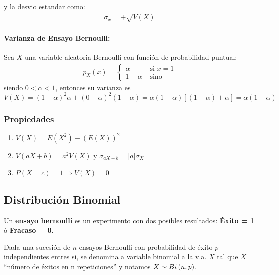 	y la desvio estandar como:
	\begin{align*}
	\sigma_x = +\sqrt{V(X)}
	\end{align*}
	
		\paragraph{Varianza de Ensayo Bernoulli:} Sea $X$ una variable aleatoria Bernoulli con función de probabilidad puntual:
		\begin{align*}
	        p_X(x) = \left\{
	        \begin{array}{cc}
	            \alpha & \text{ si } x = 1 \\
	            1-\alpha & \text{ sino}
	        \end{array}
	        \right.
		\end{align*}
		siendo $0 <\alpha < 1$, entonces su varianza es $$V(X) = (1-\alpha)^2\alpha + (0-\alpha)^2(1-\alpha) = \alpha(1-\alpha)\left[(1-\alpha)+\alpha\right] = \alpha(1-\alpha)$$
	
	\subsubsection{Propiedades}
	\begin{enumerate}
	\item $V(X) = E(X^2) - \left(E(X)\right)^2$

	\item $V(aX+b) = a^2V(X)$ y $\sigma_{aX+b} = |a|\sigma_X$
	
	\item $P(X=c)=1 \Rightarrow V(X) = 0$
	\end{enumerate}

\subsection{Distribución Binomial}

Un \textbf{ensayo bernoulli} es un experimento con dos posibles resultados: \textbf{Éxito = 1} ó \textbf{Fracaso = 0}.

Dada una sucesión de $n$ ensayos Bernoulli con probabilidad de éxito $p$ independientes entres si, se denomina a variable binomial a la v.a. $X$ tal que $X =$ ``número de éxitos en n repeticiones'' y notamos $X\sim Bi\left(n,p\right)$.

